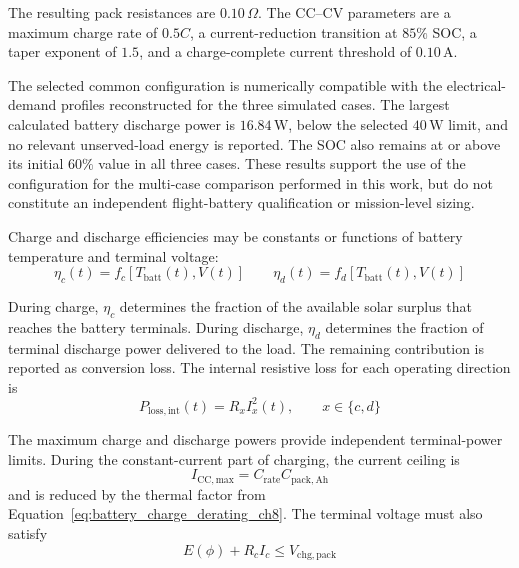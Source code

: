 The resulting pack resistances are \(0.10\,\Omega\). The CC--CV parameters are a
maximum charge rate of \(0.5C\), a current-reduction transition at
\(85\%\) SOC, a taper exponent of \(1.5\), and a charge-complete current
threshold of \(0.10\,\mathrm{A}\).

The selected common configuration is numerically compatible with the
electrical-demand profiles reconstructed for the three simulated cases. The
largest calculated battery discharge power is \(16.84\,\mathrm{W}\), below
the selected \(40\,\mathrm{W}\) limit, and no relevant unserved-load energy is
reported. The SOC also remains at or above its initial \(60\%\) value in all
three cases. These results support the use of the configuration for the
multi-case comparison performed in this work, but do not constitute an
independent flight-battery qualification or mission-level sizing.

Charge and discharge efficiencies may be constants or functions of battery
temperature and terminal voltage:
\begin{equation}
    \eta_c(t)
    =
    f_c\!\left[T_{\mathrm{batt}}(t),V(t)\right]
    \qquad
    \eta_d(t)
    =
    f_d\!\left[T_{\mathrm{batt}}(t),V(t)\right]
    \label{eq:battery_efficiency_functions_ch8}
\end{equation}

During charge, $\eta_c$ determines the fraction of the available solar
surplus that reaches the battery terminals. During discharge, $\eta_d$
determines the fraction of terminal discharge power delivered to the load.
The remaining contribution is reported as conversion loss. The internal
resistive loss for each operating direction is
\begin{equation}
    P_{\mathrm{loss,int}}(t)=R_x I_x^2(t),
    \qquad x\in\{c,d\}
    \label{eq:battery_internal_loss_ch8}
\end{equation}

The maximum charge and discharge powers provide independent terminal-power
limits. During the constant-current part of charging, the current ceiling is
\begin{equation}
    I_{\mathrm{CC,max}}
    =
    C_{\mathrm{rate}}C_{\mathrm{pack,Ah}}
    \label{eq:battery_cc_current_limit_ch8}
\end{equation}
and is reduced by the thermal factor from
Equation~\eqref{eq:battery_charge_derating_ch8}. The terminal voltage must
also satisfy
\begin{equation}
    E(\phi)+R_cI_c
    \leq
    V_{\mathrm{chg,pack}}
    \label{eq:battery_cv_voltage_limit_ch8}
\end{equation}

